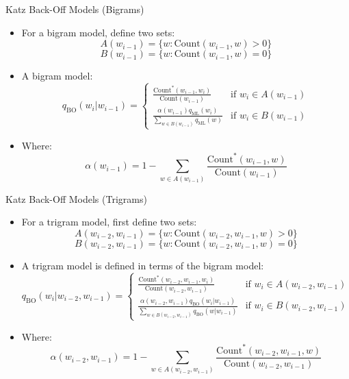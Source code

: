 \documentclass[10pt]{beamer}
\begin{document}
\begin{frame}{Katz Back-Off Models (Bigrams)}
    \begin{itemize}
        \item For a bigram model, define two sets:
        \[
        A(w_{i-1}) = \{w : \text{Count}(w_{i-1}, w) > 0\}
        \]
        \[
        B(w_{i-1}) = \{w : \text{Count}(w_{i-1}, w) = 0\}
        \]
        \item A bigram model:
        \[
        q_{\text{BO}}(w_i | w_{i-1}) =
        \begin{cases}
            \frac{\text{Count}^*(w_{i-1}, w_i)}{\text{Count}(w_{i-1})} & \text{if } w_i \in A(w_{i-1}) \\
            \frac{\alpha(w_{i-1}) q_{\text{ML}}(w_i)}{\sum_{w \in B(w_{i-1})} q_{\text{ML}}(w)} & \text{if } w_i \in B(w_{i-1})
        \end{cases}
        \]
        \item Where:
        \[
        \alpha(w_{i-1}) = 1 - \sum_{w \in A(w_{i-1})} \frac{\text{Count}^*(w_{i-1}, w)}{\text{Count}(w_{i-1})}
        \]
    \end{itemize}
\end{frame}

\begin{frame}{Katz Back-Off Models (Trigrams)}
\begin{scriptsize}
    \begin{itemize}
        \item For a trigram model, first define two sets:
        \[
        A(w_{i-2}, w_{i-1}) = \{w : \text{Count}(w_{i-2}, w_{i-1}, w) > 0\}
        \]
        \[
        B(w_{i-2}, w_{i-1}) = \{w : \text{Count}(w_{i-2}, w_{i-1}, w) = 0\}
        \]
        \item A trigram model is defined in terms of the bigram model:
        \[
        q_{\text{BO}}(w_i | w_{i-2}, w_{i-1}) =
        \begin{cases}
            \frac{\text{Count}^*(w_{i-2}, w_{i-1}, w_i)}{\text{Count}(w_{i-2}, w_{i-1})} & \text{if } w_i \in A(w_{i-2}, w_{i-1}) \\
            \frac{\alpha(w_{i-2}, w_{i-1}) q_{\text{BO}}(w_i|w_{i-1})}{\sum_{w \in B(w_{i-2}, w_{i-1})} q_{\text{BO}}(w|w_{i-1})} & \text{if } w_i \in B(w_{i-2}, w_{i-1})
        \end{cases}
        \]
        \item Where:
        \[
        \alpha(w_{i-2}, w_{i-1}) = 1 - \sum_{w \in A(w_{i-2}, w_{i-1})} \frac{\text{Count}^*(w_{i-2}, w_{i-1}, w)}{\text{Count}(w_{i-2}, w_{i-1})}
        \]
    \end{itemize}
    
    \end{scriptsize}
\end{frame}
\end{document}

